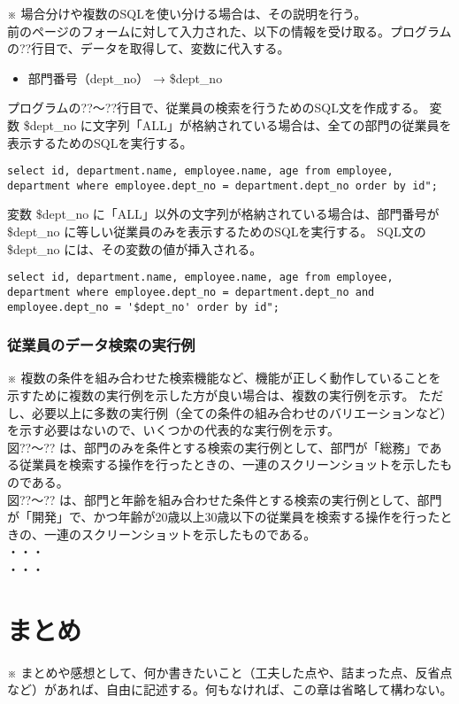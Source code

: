 \documentclass[a4j,12pt]{jreport}
\begin{document}
※ 場合分けや複数のSQLを使い分ける場合は、その説明を行う。\\

前のページのフォームに対して入力された、以下の情報を受け取る。プログラムの??行目で、データを取得して、変数に代入する。

\begin{itemize}
\item 部門番号（dept\_no） → \$dept\_no
\end{itemize}

プログラムの??～??行目で、従業員の検索を行うためのSQL文を作成する。
変数 \$dept\_no に文字列「ALL」が格納されている場合は、全ての部門の従業員を表示するためのSQLを実行する。

\begin{lstlisting}[caption=全ての従業員を表示するためのSQL]
select id, department.name, employee.name, age from employee, department where employee.dept_no = department.dept_no order by id";
\end{lstlisting}
\vspace{3mm}

変数 \$dept\_no に「ALL」以外の文字列が格納されている場合は、部門番号が \$dept\_no に等しい従業員のみを表示するためのSQLを実行する。
SQL文の \$dept\_no には、その変数の値が挿入される。

\begin{lstlisting}[caption=指定された部門番号に所属する従業員を検索するためのSQL]
select id, department.name, employee.name, age from employee, department where employee.dept_no = department.dept_no and employee.dept_no = '$dept_no' order by id";
\end{lstlisting}
\vspace{3mm}


\subsection{従業員のデータ検索の実行例}

※ 複数の条件を組み合わせた検索機能など、機能が正しく動作していることを示すために複数の実行例を示した方が良い場合は、複数の実行例を示す。
ただし、必要以上に多数の実行例（全ての条件の組み合わせのバリエーションなど）を示す必要はないので、いくつかの代表的な実行例を示す。\\

図??～?? は、部門のみを条件とする検索の実行例として、部門が「総務」である従業員を検索する操作を行ったときの、一連のスクリーンショットを示したものである。\\

図??～?? は、部門と年齢を組み合わせた条件とする検索の実行例として、部門が「開発」で、かつ年齢が20歳以上30歳以下の従業員を検索する操作を行ったときの、一連のスクリーンショットを示したものである。\\

・・・\\

・・・


\chapter{まとめ}

※ まとめや感想として、何か書きたいこと（工夫した点や、詰まった点、反省点など）があれば、自由に記述する。何もなければ、この章は省略して構わない。
\end{document}
